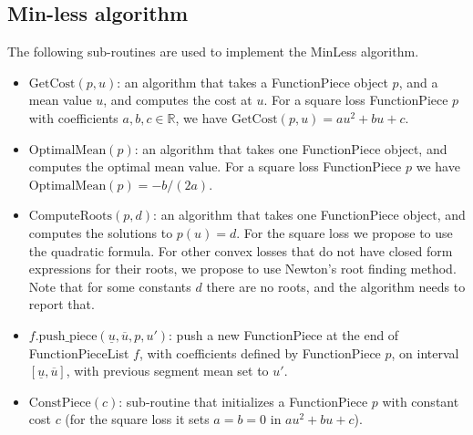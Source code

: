 \documentclass{article}
\newcommand{\RR}{\mathbb R}
\begin{document}
\subsection{Min-less algorithm}

The following sub-routines are used to implement the MinLess algorithm.

\begin{itemize}
\item $\text{GetCost}(p, u)$: an algorithm that takes a FunctionPiece
  object $p$, and a mean value $u$, and computes the cost at $u$. For
  a square loss FunctionPiece $p$ with coefficients $a,b,c\in\RR$, we
  have $\text{GetCost}(p,u)=au^2+bu+c$.
\item $\text{OptimalMean}(p)$: an algorithm that takes one
  FunctionPiece object, and computes the optimal mean value. For a
  square loss FunctionPiece $p$ we have
  $\text{OptimalMean}(p)=-b/(2a)$.
\item $\text{ComputeRoots}(p, d)$: an algorithm that takes one
  FunctionPiece object, and computes the solutions to $p(u)=d$. For
  the square loss we propose to use the quadratic formula. For other
  convex losses that do not have closed form expressions for their
  roots, we propose to use Newton's root finding method. Note that for
  some constants $d$ there are no roots, and the algorithm needs to
  report that.
\item $f.\text{push\_piece}(\underline u, \overline u, p, u')$: push a
  new FunctionPiece at the end of FunctionPieceList $f$, with
  coefficients defined by FunctionPiece $p$, on interval
  $[\underline u, \overline u]$, with previous segment mean set to
  $u'$.
\item $\text{ConstPiece}(c)$: sub-routine that initializes a
  FunctionPiece $p$ with constant cost $c$ (for the square loss it
  sets $a=b=0$ in $au^2 + bu + c$).
\end{itemize}
\end{document}

